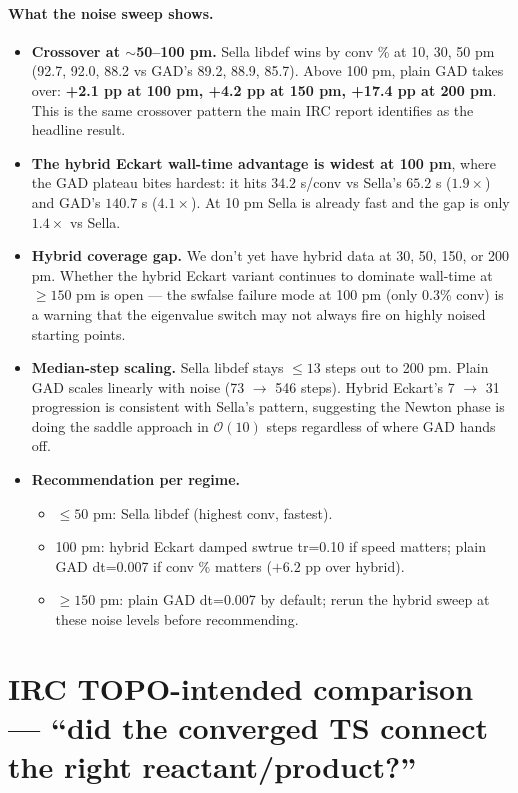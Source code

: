 \documentclass[11pt]{article}
\begin{document}
\paragraph{What the noise sweep shows.}
\begin{itemize}[leftmargin=1.5em, itemsep=0.05em]
\item \textbf{Crossover at $\sim$50--100 pm.} Sella libdef wins by conv
  \% at 10, 30, 50 pm (92.7, 92.0, 88.2 vs GAD's 89.2, 88.9, 85.7).
  Above 100 pm, plain GAD takes over: \textbf{+2.1 pp at 100 pm, +4.2 pp
  at 150 pm, +17.4 pp at 200 pm}. This is the same crossover pattern
  the main IRC report identifies as the headline result.
\item \textbf{The hybrid Eckart wall-time advantage is widest at 100
  pm}, where the GAD plateau bites hardest: it hits $34.2$ s/conv vs
  Sella's $65.2$ s ($1.9\times$) and GAD's $140.7$ s ($4.1\times$). At
  10 pm Sella is already fast and the gap is only $1.4\times$ vs Sella.
\item \textbf{Hybrid coverage gap.} We don't yet have hybrid data at
  30, 50, 150, or 200 pm. Whether the hybrid Eckart variant continues
  to dominate wall-time at $\ge 150$ pm is open --- the swfalse failure
  mode at 100 pm (only 0.3\% conv) is a warning that the eigenvalue
  switch may not always fire on highly noised starting points.
\item \textbf{Median-step scaling.} Sella libdef stays $\le 13$ steps
  out to 200 pm. Plain GAD scales linearly with noise (73 $\to$ 546
  steps). Hybrid Eckart's 7 $\to$ 31 progression is consistent with
  Sella's pattern, suggesting the Newton phase is doing the saddle
  approach in $\mathcal{O}(10)$ steps regardless of where GAD hands off.
\item \textbf{Recommendation per regime.}
  \begin{itemize}[leftmargin=1.5em, itemsep=0.02em]
  \item $\le 50$ pm: Sella libdef (highest conv, fastest).
  \item 100 pm: hybrid Eckart damped swtrue tr=0.10 if speed matters;
    plain GAD dt=0.007 if conv \% matters ($+6.2$ pp over hybrid).
  \item $\ge 150$ pm: plain GAD dt=0.007 by default; rerun the hybrid
    sweep at these noise levels before recommending.
  \end{itemize}
\end{itemize}

\section*{IRC TOPO-intended comparison --- ``did the converged TS connect the right reactant/product?''}
\end{document}
